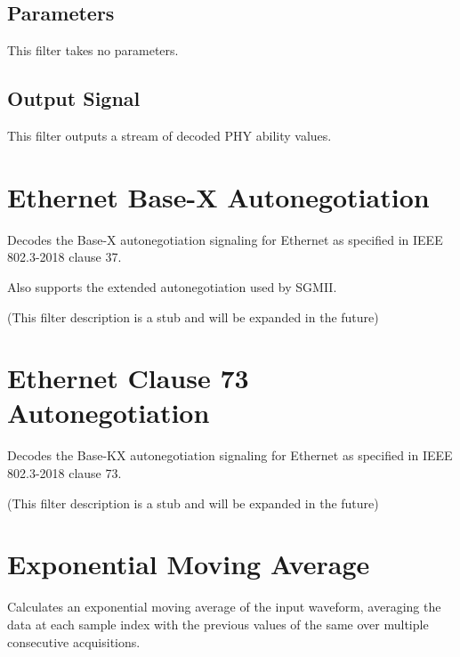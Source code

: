 \subsection{Parameters}

This filter takes no parameters.

\subsection{Output Signal}

This filter outputs a stream of decoded PHY ability values.

\pagebreak
\section{Ethernet Base-X Autonegotiation}
\label{filter:basex_negotiation}

Decodes the Base-X autonegotiation signaling for Ethernet as specified in IEEE 802.3-2018 clause 37.

Also supports the extended autonegotiation used by SGMII.

(This filter description is a stub and will be expanded in the future)

\pagebreak
\section{Ethernet Clause 73 Autonegotiation}
\label{filter:clause73_negotiation}

Decodes the Base-KX autonegotiation signaling for Ethernet as specified in IEEE 802.3-2018 clause 73.

(This filter description is a stub and will be expanded in the future)

\pagebreak
\section{Exponential Moving Average}
\label{filter:ema}

Calculates an exponential moving average of the input waveform, averaging the data at each sample index with the
previous values of the same over multiple consecutive acquisitions.

